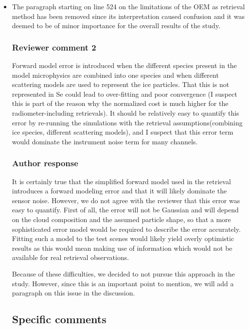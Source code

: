 \documentclass[11pt]{scrartcl}
\begin{document}
\begin{itemize}
\item The paragraph starting on line 524 on the limitations of the OEM as
  retrieval method has been removed since its interpretation caused confusion
  and it was deemed to be of minor importance for the overall results of the study.

\subsubsection*{Reviewer comment 2}

Forward model error is introduced when the different species present in the
model microphysics are combined into one species and when different scattering
models are used to represent the ice particles. That this is not represented in
Se could lead to over-fitting and poor convergence (I suspect this is part of
the reason why the normalized cost is much higher for the radiometer-including
retrievals). It should be relatively easy to quantify this error by re-running
the simulations with the retrieval assumptions(combining ice species, different
scattering models), and I suspect that this error term would dominate the
instrument noise term for many channels.

\subsubsection*{Author response}

It is certainly true that the simplified forward model used in the retrieval
introduces a forward modeling error and that it will likely dominate the sensor
noise. However, we do not agree with the reviewer that this error was easy to
quantify. First of all, the error will not be Gaussian and will depend on the
cloud composition and the assumed particle shape, so that a more sophisticated
error model would be required to describe the error accurately. Fitting such a
model to the test scenes would likely yield overly optimistic results as this
would mean making use of information which would not be available
for real retrieval observations.

Because of these difficulties, we decided to not pursue this approach in the
study. However, since this is an important point to mention, we will add a
paragraph on this issue in the discussion.

\subsection{Specific comments}


\end{itemize}
\end{document}
